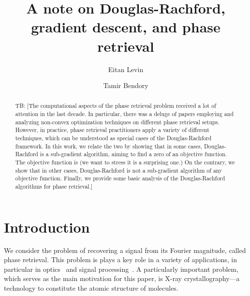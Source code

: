 \documentclass[12pt]{article}
\theoremstyle{definition}
\theoremstyle{remark}
\theoremstyle{definition}
\theoremstyle{problem}
\theoremstyle{definition}
\newcommand{\tb}[1]{{\color{blue}TB: {[#1]}}}
\begin{document}

\title{A note on Douglas-Rachford, gradient descent, and phase retrieval}

\author[1]{Eitan Levin}
\author[1]{Tamir Bendory}

\maketitle

\begin{abstract}
\tb{The computational aspects of the phase retrieval problem received a lot of attention in the last decade. In particular, there was a deluge of papers employing and analyzing non-convex optimization techniques on different phase retrieval setups. However, in practice, phase retrieval practitioners apply a variety of different techniques, which can be understood as special cases of the Douglas-Rachford framework. In this work, we relate the two by showing that in some cases, Douglas-Rachford is a sub-gradient algorithm, aiming to find a zero of an objective function.
The objective function is (we want to stress it is a surprising one.)	
On the contrary, we show that in other cases,  Douglas-Rachford is not a sub-gradient algorithm of any objective function. Finally, we provide some basic analysis of the Douglas-Rachford algorithms for phase retrieval.}
\end{abstract}

	
\section{Introduction}

We consider the problem of recovering a signal from its Fourier magnitude, called phase retrieval. 
This problem is plays a key role in a variety of applications, in particular in optics~\cite{walther1963question,shechtman2015phase,trebino2012frequency,fienup1987phase} and signal processing~\cite{Bendory2017,baykal2004blind,lawrence2008fundamentals,bendory2017bispectrum}. 
A particularly important problem, which serves as the main motivation for this paper, is X-ray crystallography---a technology to constitute the atomic structure of molecules. 
\end{document}
